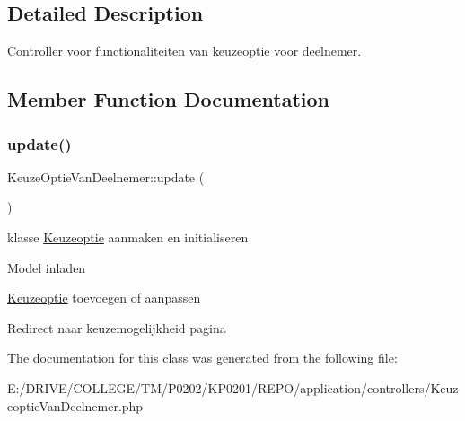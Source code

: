 \subsection{Detailed Description}
Controller voor functionaliteiten van keuzeoptie voor deelnemer. 

\subsection{Member Function Documentation}
\mbox{\label{class_keuze_optie_van_deelnemer_a04438616b87ca22ac662c94abc043c39}} 
\subsubsection{\texorpdfstring{update()}{update()}}
{\footnotesize\ttfamily Keuze\+Optie\+Van\+Deelnemer\+::update (\begin{DoxyParamCaption}{ }\end{DoxyParamCaption})}

klasse \mbox{\hyperlink{class_keuzeoptie}{Keuzeoptie}} aanmaken en initialiseren

Model inladen

\mbox{\hyperlink{class_keuzeoptie}{Keuzeoptie}} toevoegen of aanpassen

Redirect naar keuzemogelijkheid pagina 

The documentation for this class was generated from the following file\+:\begin{DoxyCompactItemize}
\item 
E\+:/\+D\+R\+I\+V\+E/\+C\+O\+L\+L\+E\+G\+E/\+T\+M/\+P0202/\+K\+P0201/\+R\+E\+P\+O/application/controllers/Keuzeoptie\+Van\+Deelnemer.\+php\end{DoxyCompactItemize}
